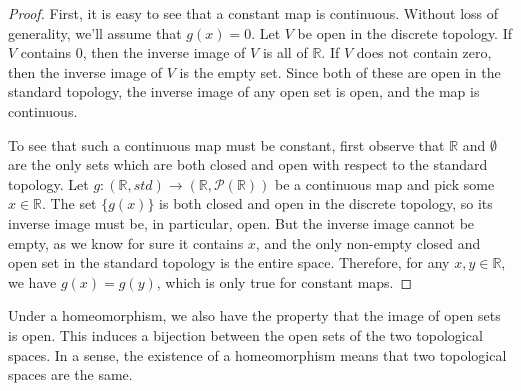  \begin{proof}
 	
 	First, it is easy to see that a constant map is continuous.  Without loss of generality, we'll assume that $g(x)=0$.  Let $V$ be open in the discrete topology.  If $V$ contains $0$, then the inverse image of $V$ is all of $\mathbb{R}$.  If $V$ does not contain zero, then the inverse image of $V$ is the empty set.  Since both of these are open in the standard topology, the inverse image of any open set is open, and the map is continuous.
 	
 	To see that such a continuous map must be constant, first observe that $\mathbb{R}$ and $\emptyset$ are the only sets which are both closed and open with respect to the standard topology.  Let $g: (\mathbb{R},std)\rightarrow (\mathbb{R},\mathcal{P}(\mathbb{R})) $ be a continuous map and pick some $x\in \mathbb{R}$.  The set $\{g(x)\}$ is both closed and open in the discrete topology, so its inverse image must be, in particular, open.  But the inverse image cannot be empty, as we know for sure it contains $x$, and the only non-empty closed and open set in the standard topology is the entire space.  Therefore, for any $x,y\in\mathbb{R}$, we have $g(x)=g(y)$, which is only true for constant maps.
 	
 	
 \end{proof}
 
 
 
 
 
 
 Under a homeomorphism, we also have the property that the image of open sets is open.  This induces a bijection between the open sets of the two topological spaces.  In a sense, the existence of a homeomorphism means that two topological spaces are the same.
 
 

